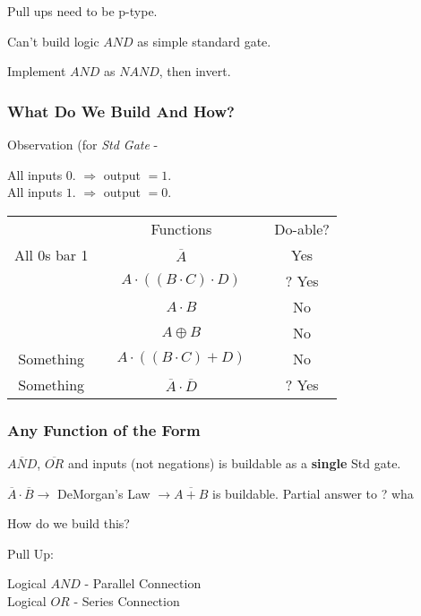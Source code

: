 \documentclass[a4paper,12pt]{article}
\begin{document}
Pull ups need to be p-type.

Can't build logic $AND$ as simple standard gate.

Implement $AND$ as $NAND$, then invert.

\begin{figure}[hbtp]


\end{figure}

\subsubsection*{What Do We Build And How?}

Observation (for \emph{Std Gate} - 

All inputs $0$. $\Rightarrow$ output $= 1$. \\
All inputs $1$. $\Rightarrow$ output $= 0$.

\begin{tabular}{ccccc}
						&	\hspace{10mm}	&	Functions	&	\hspace{10mm}	&	Do-able?	\\
All $0$s bar 1		&					&	$\overline{A}$	&		&	Yes	\\
				&	& $A \cdot ((B \cdot C) \cdot D)$		&		&	? Yes	\\
					&						&	$A \cdot B$		&		&	No	\\
					&						&	$A \oplus B$		&		&	No	\\
Something		&						&	$A \cdot ((B \cdot C) + D)$	&	&	No	\\
Something		&				&	$\overline{A} \cdot \overline{D}$	& 		& ? Yes
\end{tabular}

\subsubsection*{Any Function of the Form}

$\overline{AND}$, $\overline{OR}$ and inputs (not negations) is
buildable as a \textbf{single} Std gate.

$\overline{A} \cdot \overline{B} \to$ DeMorgan's Law $\to
\overline{A+B}$ is buildable. Partial answer to ? wha %

How do we build this?

Pull Up:

Logical $AND$ - Parallel Connection \\
Logical $OR$  - Series Connection 
\end{document}
